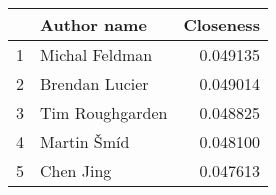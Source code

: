 \begin{tabular}{llr}
\toprule
{} &      Author name &  Closeness \\
\midrule
1 &   Michal Feldman &   0.049135 \\
2 &   Brendan Lucier &   0.049014 \\
3 &  Tim Roughgarden &   0.048825 \\
4 &      Martin Šmíd &   0.048100 \\
5 &       Chen  Jing &   0.047613 \\
\bottomrule
\end{tabular}
